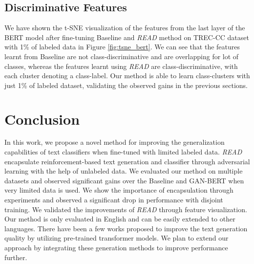 \documentclass[11pt]{article}
\begin{document}
\subsection { Discriminative Features}
We have shown the t-SNE \cite{van2008visualizing} visualization of the features from the last layer of the BERT model after fine-tuning Baseline and \textit{READ} method on TREC-CC dataset with 1\% of labeled data in Figure \ref{fig:tsne_bert}. We can see that the features learnt from Baseline are not class-discriminative and are overlapping for lot of classes, whereas the features learnt using \textit{READ} are class-discriminative, with each cluster denoting a class-label. Our method is able to learn class-clusters with just 1\% of labeled dataset, validating the observed gains in the previous sections.


\section{Conclusion}
In this work, we propose a novel method for improving the generalization capabilities of text classifiers when fine-tuned with limited labeled data. \textit{READ} encapsulate reinforcement-based text generation and classifier through adversarial learning with the help of unlabeled data. We evaluated our method on multiple datasets and observed significant gains over the Baseline and GAN-BERT when very limited data is used. We show the importance of encapsulation through experiments and observed a significant drop in performance with disjoint training. We validated the improvements of \textit{READ} through feature visualization. Our method is only evaluated in English and can be easily extended to other languages. There have been a few works \cite{dong2019unified, li2021pretrained} proposed to improve the text generation quality by utilizing pre-trained transformer models. We plan to extend our approach by integrating these generation methods to improve performance further. 
\end{document}

